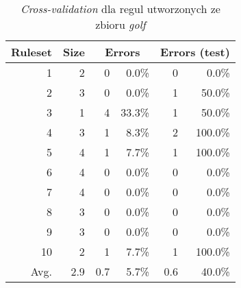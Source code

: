 \begin{table}
\begin{tabular}{|r|r|rr|rr|}
\hline
 Ruleset & 
 Size & 
 \multicolumn{2}{|c|}{Errors} & 
 \multicolumn{2}{|c|}{Errors (test)} \\
\hline\hline
       1 &    2 &    0 &  0.0\%  &    0 &   0.0\% \\
       2 &    3 &    0 &  0.0\%  &    1 &  50.0\% \\
       3 &    1 &    4 & 33.3\%  &    1 &  50.0\% \\
       4 &    3 &    1 &  8.3\%  &    2 & 100.0\% \\
       5 &    4 &    1 &  7.7\%  &    1 & 100.0\% \\
       6 &    4 &    0 &  0.0\%  &    0 &   0.0\% \\
       7 &    4 &    0 &  0.0\%  &    0 &   0.0\% \\
       8 &    3 &    0 &  0.0\%  &    0 &   0.0\% \\
       9 &    3 &    0 &  0.0\%  &    0 &   0.0\% \\
      10 &    2 &    1 &  7.7\%  &    1 & 100.0\% \\
\hline\hline
    Avg. &  2.9 &  0.7 &  5.7\%  &  0.6 &  40.0\% \\
\hline
\end{tabular}
\caption{\emph{Cross-validation} dla regul utworzonych ze zbioru \emph{golf}}
\label{p2t2-golf-rules-cv}
\end{table}